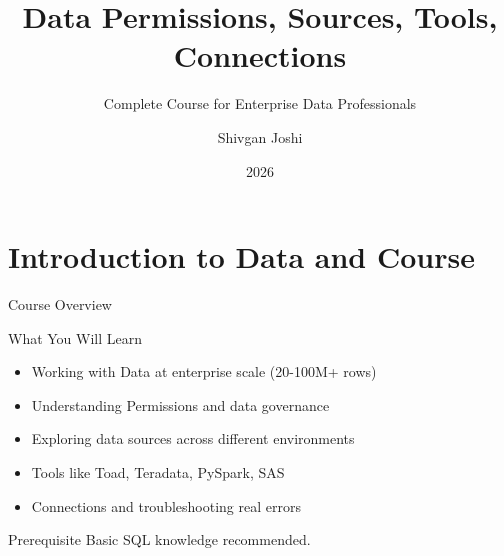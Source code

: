 \documentclass{beamer}
\title{Data Permissions, Sources, Tools, Connections}
\subtitle{Complete Course for Enterprise Data Professionals}
\author{Shivgan Joshi}
\institute{Udemy}
\date{2026}
\begin{document}
	
	\begin{frame}
		\titlepage
	\end{frame}
	
	\section{Introduction to Data and Course}
	
	\begin{frame}{Course Overview}
		\begin{block}{What You Will Learn}
			\begin{itemize}
				\item Working with Data at enterprise scale (20-100M+ rows)
				\item Understanding Permissions and data governance
				\item Exploring data sources across different environments
				\item Tools like Toad, Teradata, PySpark, SAS
				\item Connections and troubleshooting real errors
			\end{itemize}
		\end{block}
		\begin{alertblock}{Prerequisite}
			Basic SQL knowledge recommended.
		\end{alertblock}
	\end{frame}
	
\end{document}
